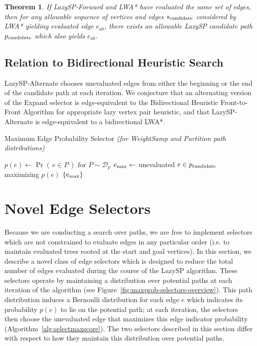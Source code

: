 \documentclass[nobib]{tufte-book}
\newcommand{\ms}[1]{\mbox{\scriptsize #1}}
\newtheorem{theorem}{Theorem}
\begin{document}
\begin{theorem}
If LazySP-Forward and LWA* have evaluated the same set of edges,
then for any allowable sequence of vertices and edges $s_{\ms{candidate}}$
considered by LWA* yielding evaluated edge $e_{ab}$,
there exists an allowable LazySP candidate path $p_{\ms{candidate}}$
which also yields $e_{ab}$.
\label{thm:lwastar-equiv-to-lazy}
\end{theorem}

\subsection{Relation to Bidirectional Heuristic Search}

LazySP-Alternate chooses unevaluated edges from either
the beginning or the end of the candidate path at each iteration.
We conjecture that an alternating version of the Expand selector
is edge-equivalent to the
Bidirectional Heuristic Front-to-Front Algorithm
\citep{sint1977bhffa}
for appropriate lazy vertex pair heuristic,
and that LazySP-Alternate is edge-equivalent
to a bidirectional LWA*.

\begin{algorithm}[t]
   \caption{Maximum Edge Probability Selector
      \emph{(for WeightSamp and Partition path distributions)}}
   \begin{algorithmic}[1]
   \Function {\textsc{SelectMaxEdgeProb}}{$G, p_{\ms{candidate}}, \mathcal{D}_p$}
   \State $p(e) \leftarrow \Pr( \, e \in P \, )
      \mbox{ for } P \sim \mathcal{D}_p$
   \State $e_{\ms{max}} \leftarrow$ unevaluated $e \in p_{\ms{candidate}}$
      maximizing $p(e)$
   \State \Return $\{ e_{\ms{max}} \}$
   \EndFunction
   \end{algorithmic}
   \label{alg:selectmaxscore}
\end{algorithm}

\section{Novel Edge Selectors}

Because we are conducting a search over paths,
we are free to implement selectors which are not constrained to
evaluate edges in any particular order
(i.e. to maintain evaluated trees rooted at the start and goal
vertices).
In this section,
we describe a novel class of edge selectors which is designed
to reduce the total number of edges evaluated during the course
of the LazySP algorithm.
These selectors operate by maintaining a distribution over potential
paths at each iteration of the algorithm
(see Figure~\ref{fig:maxprob-selectors-overview}).
This path distribution induces a Bernoulli distribution for each
edge $e$ which indicates its probability $p(e)$ to lie on
the potential path;
at each iteration,
the selectors then choose the unevaluated edge that maximizes
this edge indicator probability (Algorithm~\ref{alg:selectmaxscore}).
The two selectors described in this section differ
with respect to how they maintain this distribution over potential paths.
\end{document}
